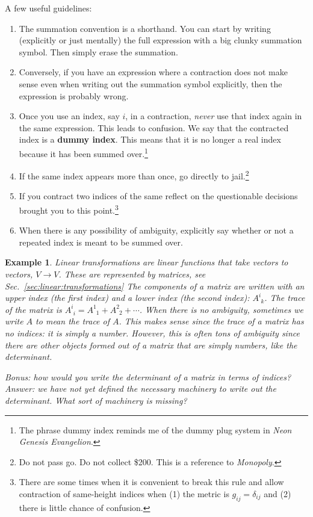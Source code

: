 \documentclass[
  11pt,
	colorful,
	raggedright,
]{tufte-style-thesis-flip}
\newtheorem{example}{Example}[section]
\begin{document}
A few useful guidelines:
\begin{enumerate}
  \item The summation convention is a shorthand. You can start by writing (explicitly or just mentally) the full expression with a big clunky summation symbol. Then simply erase the summation. 
  \item Conversely, if you have an expression where a contraction does not make sense even when writing out the summation symbol explicitly, then the expression is probably wrong.
  \item Once you use an index, say $i$, in a contraction, \emph{never} use that index again in the same expression. This leads to confusion. We say that the contracted index is a \textbf{dummy index}. This means that it is no longer a real index because it has been summed over.\footnote{The phrase dummy index reminds me of the dummy plug system in \emph{Neon Genesis Evangelion}.}
  \item If the same index appears more than once, go directly to jail.\footnote{Do not pass go. Do not collect \$200. This is a reference to \emph{Monopoly}.}
  \item If you contract two indices of the same reflect on the questionable decisions brought you to this point.\footnote{There are some times when it is convenient to break this rule and allow contraction of same-height indices when (1) the metric is $g_{ij}=\delta_{ij}$ and (2) there is little chance of confusion.}
  \item When there is any possibility of ambiguity, explicitly say whether or not a repeated index is meant to be summed over.  
\end{enumerate}

\begin{example}
Linear transformations are linear functions that take vectors to vectors, $V\to V$. These are represented by matrices, see Sec.~\ref{sec:linear:transformations} The components of a matrix are written with an upper index (the first index) and a lower index (the second index): $A^i_{\phantom ik}$. The trace of the matrix is $A^i_{\phantom ii} = A^1_{\phantom 11} + A^2_{\phantom 22} + \cdots$. When there is no ambiguity, sometimes we write $A$ to mean the trace of $A$. This makes sense since the trace of a matrix has no indices: it is simply a number. However, this is often tons of ambiguity since there are other objects formed out of a matrix that are simply numbers, like the determinant. 

Bonus: how would you write the determinant of a matrix in terms of indices? Answer: we have not yet defined the necessary machinery to write out the determinant. What sort of machinery is missing? 
\end{example}
\end{document}
